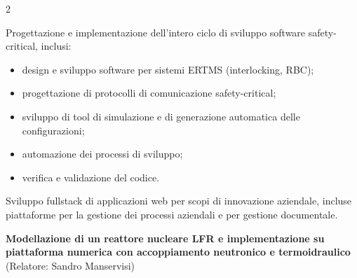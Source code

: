 \documentclass[10pt,a4paper,ragged2e,withhyper]{altacv}
\begin{document}
\begin{paracol}{2}


Progettazione e implementazione dell'intero ciclo di sviluppo software safety-critical, inclusi:
\begin{itemize}
    \item design e sviluppo software per sistemi ERTMS (interlocking, RBC);
    \item progettazione di protocolli di comunicazione safety-critical;
    \item sviluppo di tool di simulazione e di generazione automatica delle configurazioni;
    \item automazione dei processi di sviluppo;
    \item verifica e validazione del codice.
\end{itemize}

Sviluppo fullstack di applicazioni web per scopi di innovazione aziendale, incluse piattaforme per la gestione dei processi aziendali e per gestione documentale.





\medskip
{}


\textbf{Modellazione di un reattore nucleare LFR e implementazione su piattaforma numerica con accoppiamento neutronico e termoidraulico} (Relatore: Sandro Manservisi)



\end{paracol}
\end{document}
